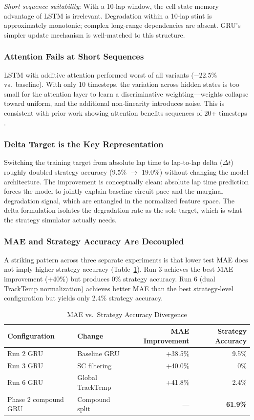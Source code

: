 \documentclass[12pt]{article}
\begin{document}
\textit{Short sequence suitability}: With a 10-lap window, the cell state memory advantage of LSTM is irrelevant. Degradation within a 10-lap stint is approximately monotonic; complex long-range dependencies are absent. GRU's simpler update mechanism is well-matched to this structure.

\subsubsection{Attention Fails at Short Sequences}

LSTM with additive attention performed worst of all variants ($-22.5\%$ vs.\ baseline). With only 10 timesteps, the variation across hidden states is too small for the attention layer to learn a discriminative weighting---weights collapse toward uniform, and the additional non-linearity introduces noise. This is consistent with prior work showing attention benefits sequences of 20+ timesteps \cite{bahdanau2015}.

\subsubsection{Delta Target is the Key Representation}

Switching the training target from absolute lap time to lap-to-lap delta ($\Delta t$) roughly doubled strategy accuracy (9.5\% $\to$ 19.0\%) without changing the model architecture. The improvement is conceptually clean: absolute lap time prediction forces the model to jointly explain baseline circuit pace and the marginal degradation signal, which are entangled in the normalized feature space. The delta formulation isolates the degradation rate as the sole target, which is what the strategy simulator actually needs.

\subsubsection{MAE and Strategy Accuracy Are Decoupled}

A striking pattern across three separate experiments is that lower test MAE does not imply higher strategy accuracy (Table~\ref{tab:decoupled}). Run 3 achieves the best MAE improvement (+40\%) but produces 0\% strategy accuracy. Run 6 (dual TrackTemp normalization) achieves better MAE than the best strategy-level configuration but yields only 2.4\% strategy accuracy.

\begin{table}[h]
\centering
\caption{MAE vs.\ Strategy Accuracy Divergence}
\label{tab:decoupled}
\begin{tabular}{llrr}
\toprule
Configuration & Change & MAE Improvement & Strategy Accuracy \\
\midrule
Run 2 GRU & Baseline GRU & +38.5\% & 9.5\% \\
Run 3 GRU & SC filtering & +40.0\% & 0\% \\
Run 6 GRU & Global TrackTemp & +41.8\% & 2.4\% \\
Phase 2 compound GRU & Compound split & — & \textbf{61.9\%} \\
\bottomrule
\end{tabular}
\end{table}
\end{document}
